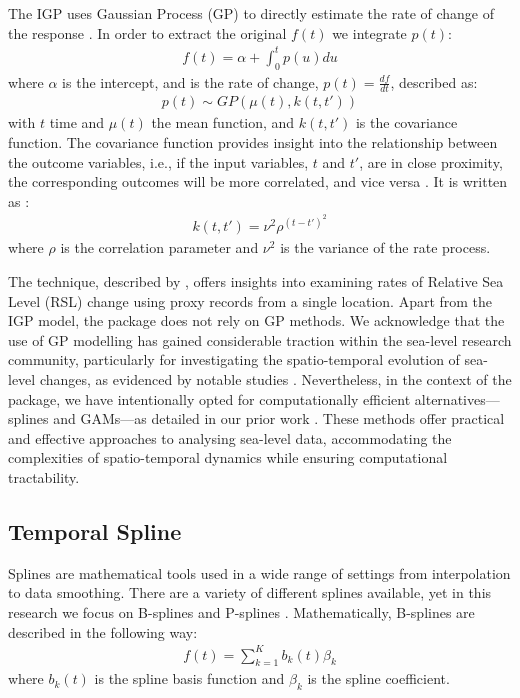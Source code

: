 The IGP uses Gaussian Process (GP) to directly estimate the rate of change of the response \citep{Holsclaw2013}. In order to extract the original \(f(t)\) we integrate \(p(t)\):
\begin{align}
    f(t) = \alpha + \int^t_0p(u)du
\end{align}
where \(\alpha\) is the intercept, and is the rate of change, \(p(t) = \frac{df}{dt}\), described as:
\begin{align}
    p(t) \sim GP(\mu(t),k(t,t'))
\end{align}
with \(t\) time and \(\mu(t)\) the mean function, and \(k(t,t')\) is the covariance function. The covariance function provides insight into the relationship between the outcome variables, i.e., if the input variables, \(t\) and \(t'\), are in close proximity, the corresponding outcomes will be more correlated, and vice versa \citep{Rasmussen2006}. It is written as \citep{Cahill2015aStats}:
\begin{align} 
    k(t,t') = \nu^2\rho^{(t-t')^2}
\end{align}
where \(\rho\) is the correlation parameter and \(\nu^2\) is the variance of the rate process.

The technique, described by \citet{Cahill2015aStats}, offers insights into examining rates of Relative Sea Level (RSL) change using proxy records from a single location. Apart from the IGP model, the  package does not rely on GP methods. We acknowledge that the use of GP modelling has gained considerable traction within the sea-level research community, particularly for investigating the spatio-temporal evolution of sea-level changes, as evidenced by notable studies \citep{Kopp2009, Kopp2013, Kopp2016, Kemp2018, Walker2021}. Nevertheless, in the context of the  package, we have intentionally opted for computationally efficient alternatives---splines and GAMs---as detailed in our prior work \citep{Upton2023noisy}. These methods offer practical and effective approaches to analysing sea-level data, accommodating the complexities of spatio-temporal dynamics while ensuring computational tractability.

\subsection{Temporal Spline}\label{temporalspline}

Splines are mathematical tools used in a wide range of settings from interpolation to data smoothing. There are a variety of different splines available, yet in this research we focus on B-splines \citep{deBoor1978, Dierckx1995} and P-splines \citep{eilers_1996}. Mathematically, B-splines are described in the following way:
\begin{align}
    f(t) = \sum^K_{k=1} b_k(t) \beta_k 
\end{align}
where \(b_k(t)\) is the spline basis function and \(\beta_k\) is the spline coefficient.


